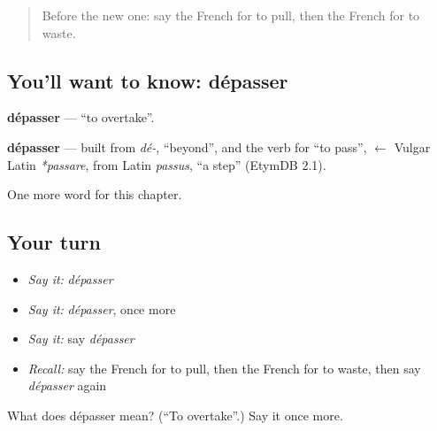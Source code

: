 \begin{quote}
Before the new one: say the French for to pull, then the French for to waste.
\end{quote}

\subsection*{You'll want to know: dépasser}
\textbf{dépasser} — \textquotedblleft{}to overtake\textquotedblright{}.

\begin{cousinweb}
\textbf{dépasser} — built from \emph{dé-}, \textquotedblleft{}beyond\textquotedblright{}, and the verb for \textquotedblleft{}to pass\textquotedblright{}, $\leftarrow$ Vulgar Latin \emph{*passare}, from Latin \emph{passus}, \textquotedblleft{}a step\textquotedblright{} (EtymDB 2.1).
\end{cousinweb}

\begin{grammarlens}[title={What you've built}]
One more word for this chapter.
\end{grammarlens}

\subsection*{Your turn}
\begin{itemize}
\raggedright
  \item \emph{Say it:} \emph{dépasser}
  \item \emph{Say it:} \emph{dépasser}, once more
  \item \emph{Say it:} say \emph{dépasser}
  \item \emph{Recall:} say the French for to pull, then the French for to waste, then say \emph{dépasser} again
\end{itemize}

\begin{tcolorbox}[breakable,colback=teal!4,colframe=teal!35!black,title={Before you move on}]
What does dépasser mean? (\textquotedblleft{}To overtake\textquotedblright{}.) Say it once more.
\end{tcolorbox}
